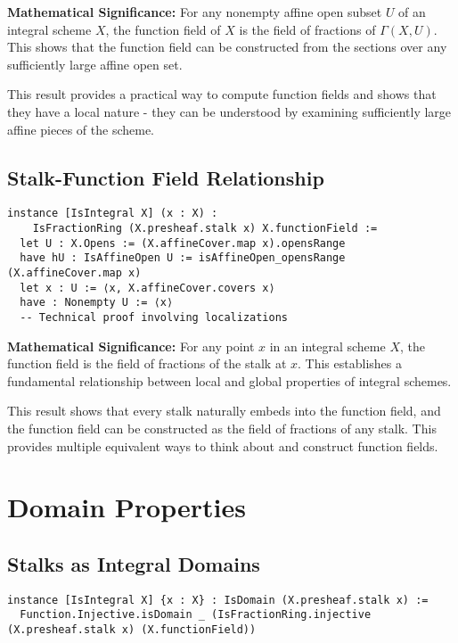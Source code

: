 \documentclass{article}
\theoremstyle{definition}
\begin{document}
\textbf{Mathematical Significance:} For any nonempty affine open subset $U$ of an integral scheme $X$, the function field of $X$ is the field of fractions of $\Gamma(X, U)$. This shows that the function field can be constructed from the sections over any sufficiently large affine open set.

This result provides a practical way to compute function fields and shows that they have a local nature - they can be understood by examining sufficiently large affine pieces of the scheme.

\subsection{Stalk-Function Field Relationship}

\begin{lstlisting}
instance [IsIntegral X] (x : X) :
    IsFractionRing (X.presheaf.stalk x) X.functionField :=
  let U : X.Opens := (X.affineCover.map x).opensRange
  have hU : IsAffineOpen U := isAffineOpen_opensRange (X.affineCover.map x)
  let x : U := ⟨x, X.affineCover.covers x⟩
  have : Nonempty U := ⟨x⟩
  -- Technical proof involving localizations
\end{lstlisting}

\textbf{Mathematical Significance:} For any point $x$ in an integral scheme $X$, the function field is the field of fractions of the stalk at $x$. This establishes a fundamental relationship between local and global properties of integral schemes.

This result shows that every stalk naturally embeds into the function field, and the function field can be constructed as the field of fractions of any stalk. This provides multiple equivalent ways to think about and construct function fields.

\section{Domain Properties}

\subsection{Stalks as Integral Domains}

\begin{lstlisting}
instance [IsIntegral X] {x : X} : IsDomain (X.presheaf.stalk x) :=
  Function.Injective.isDomain _ (IsFractionRing.injective (X.presheaf.stalk x) (X.functionField))
\end{lstlisting}
\end{document}
